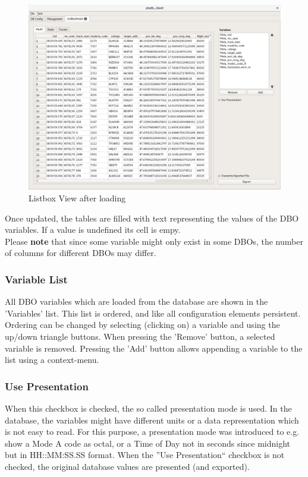 \begin{figure}[H]
    \hspace*{-2cm}
    \includegraphics[width=18cm,frame]{../screenshots/listbox_loaded.png}
  \caption{Listbox View after loading}
  \label{fig:listbox_load}
\end{figure}

Once updated, the tables are filled with text representing the values of the DBO variables.  If a value is undefined its cell is empy. \\

Please \textbf{note} that since some variable might only exist in some DBOs, the number of columns for different DBOs may differ.

\subsubsection{Variable List}
All DBO variables which are loaded from the database are shown in the 'Variables' list. This list is ordered,
and like all configuration elements persistent. Ordering can be changed by selecting (clicking on) a variable
and using the up/down triangle buttons.
When pressing the 'Remove' button, a selected variable is removed.  Pressing the 'Add' button allows
appending a variable to the list using a context-menu.

\subsubsection{Use Presentation}
When this checkbox is checked, the so called presentation mode is used. In the database, the variables might have different units or a data representation which is not easy to read. For this purpose, a presentation mode was introduced to e.g. show a Mode A code as octal, or a Time of Day not in seconds since midnight but in HH::MM:SS.SS format. When the ''Use Presentation`` checkbox is not checked, the original database values are presented (and exported).

